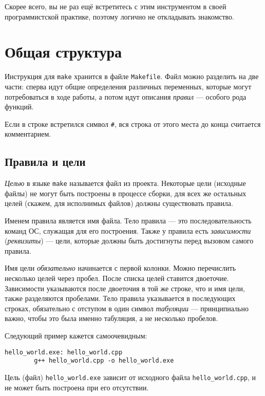 \documentclass[11pt,a4paper,oneside]{article}
\begin{document}
Скорее всего, вы не раз ещё встретитесь с этим инструментом в своей программистской 
практике, поэтому логично не откладывать знакомство.

\section*{Общая структура}

Инструкция для \texttt{make} хранится в файле \texttt{Makefile}. Файл
можно разделить на две части: сперва идут общие определения различных переменных,
которые могут потребоваться в ходе работы, а потом идут описания \emph{правил} ---
особого рода функций.

Если в строке встретился символ \verb!#!, вся строка от этого места до конца
считается комментарием.

\subsection*{Правила и цели}

\emph{Целью} в языке \texttt{make} называется файл из проекта. Некоторые цели
(исходные файлы) не могут быть построены в процессе сборки, для всех же остальных
целей (скажем, для исполнимых файлов) должны существовать правила.

Именем правила является имя файла. Тело правила --- это последовательность
команд ОС, служащая для его построения. Также у правила есть \emph{зависимости} 
(\emph{реквизиты}) --- цели, которые должны быть достигнуты перед вызовом самого
правила. 

Имя цели \emph{обязательно} начинается с первой колонки. Можно перечислить несколько
целей через пробел. После списка целей ставится двоеточие.
Зависимости указываются после двоеточия в той же строке, что и имя цели, также разделяются
пробелами. Тело правила указывается в последующих строках, обязательно с отступом в один
символ \emph{табуляции} --- принципиально важно, чтобы это была именно табуляция, 
а не несколько пробелов.

Следующий пример кажется самоочевидным:
\begin{verbatim}
hello_world.exe: hello_world.cpp
        g++ hello_world.cpp -o hello_world.exe
\end{verbatim}

Цель (файл) \verb!hello_world.exe! зависит от исходного файла \verb!hello_world.cpp!,
и не может быть построена при его отсутствии.
\end{document}

